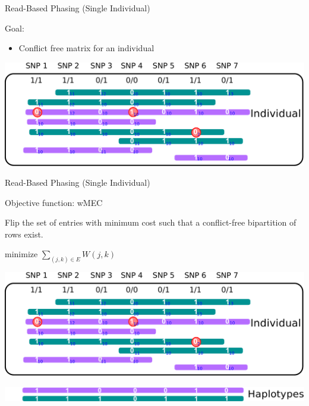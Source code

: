 \documentclass[notes=hide]{beamer}
\begin{document}
\begin{frame}{Read-Based Phasing (Single Individual)}
	\vspace*{1.3mm}
	\begin{center}
		\begin{block}{Goal:}
			\begin{itemize}
				\item Conflict free matrix for an individual				
			\end{itemize}
		\end{block}
		\bigskip
		\bigskip
		\vspace*{2.23mm}
		\includegraphics[scale=0.35]{figs/sih-phasing-complete4.pdf}
	\end{center}
\end{frame}

\begin{frame}{Read-Based Phasing (Single Individual)}
	\begin{center}
	\begin{block}{Objective function: \color{red}wMEC }

		Flip the set of entries with minimum cost such that a conflict-free bipartition of rows exist.
		\begin{center}
			minimize $\sum_{(j,k)\in E}W(j,k)$
		\end{center}
		
	\end{block}
		\bigskip
		\vspace*{.6mm}
		\includegraphics[scale=0.35]{figs/sih-phasing-complete4.pdf}\\
		\begin{center}
			\includegraphics[width=.9\textwidth]{figs/sih-phasing-complete-haplo-goal1}
		\end{center}
			
	\end{center}
\end{frame}
\end{document}
